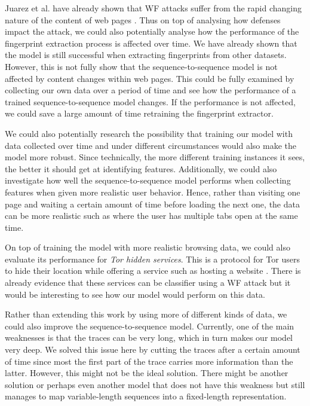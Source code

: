 Juarez et al. have already shown that WF attacks suffer from the rapid changing nature of the content of web pages \cite{wfpevaluation}.
Thus on top of analysing how defenses impact the attack, we could also potentially analyse how the performance of the fingerprint extraction process is affected over time.
We have already shown that the model is still successful when extracting fingerprints from other datasets. %
However, this is not fully show that the sequence-to-sequence model is not affected by content changes within web pages.
This could be fully examined by collecting our own data over a period of time and see how the performance of a trained sequence-to-sequence model changes.
If the performance is not affected, we could save a large amount of time retraining the fingerprint extractor.

We could also potentially research the possibility that training our model with data collected over time and under different circumstances would also make the model more robust.
Since technically, the more different training instances it sees, the better it should get at identifying features.
Additionally, we could also investigate how well the sequence-to-sequence model performs when collecting features when given more realistic user behavior.
Hence, rather than visiting one page and waiting a certain amount of time before loading the next one, the data can be more realistic such as where the user has multiple tabs open at the same time.

On top of training the model with more realistic browsing data, we could also evaluate its performance for \textit{Tor hidden services}.
This is a protocol for Tor users to hide their location while offering a service such as hosting a website \cite{tor_hidden_services}.
There is already evidence that these services can be classifier using a WF attack \cite{kfingerprinting} but it would be interesting to see how our model would perform on this data.

Rather than extending this work by using more of different kinds of data, we could also improve the sequence-to-sequence model.
Currently, one of the main weaknesses is that the traces can be very long, which in turn makes our model very deep.
We solved this issue here by cutting the traces after a certain amount of time since most the first part of the trace carries more information than the latter.
However, this might not be the ideal solution.
There might be another solution or perhaps even another model that does not have this weakness but still manages to map variable-length sequences into a fixed-length representation.

